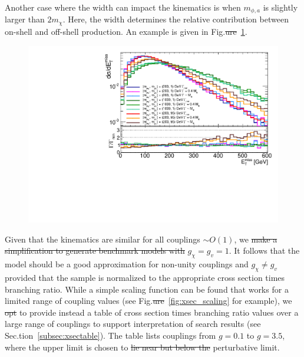 Another case where the width can impact the kinematics is when $m_{\phi,a}$ is slightly larger than $2m_\chi$. Here, the width determines the relative contribution between on-shell and off-shell production. An example is given in Fig.\sout{ure}~\ref{fig:widthlargescan}. 

\begin{figure}[!ht]
  \begin{center}
    \includegraphics[scale=0.45]{figures/ScalarWidth.pdf}
    \vspace{2mm}
    \caption{\label{fig:widthlargescan} 
    }
\end{center}
\end{figure}


Given that the kinematics are similar for all couplings $\sim O(1)$, we \sout{make a simplification to generate benchmark models with}  $g_{\chi} = g_{v} = 1$. It follows that the model should be a good approximation for non-unity couplings and $g_{\chi} \neq g_{v}$ provided that the sample is normalized to the appropriate cross section times branching ratio. While a simple scaling function can be found that works for a limited range of coupling values (see Fig.\sout{ure}~\ref{fig:xsec_scaling} for example), we \sout{opt}  to provide instead a table of cross section times branching ratio values over a large range of couplings to support interpretation of search results (see Sec.tion~\ref{subsec:xsectable}). The table  lists couplings from $g=0.1$ to $g=3.5$, where the upper limit is chosen to \sout{lie near but below the}  perturbative limit.


